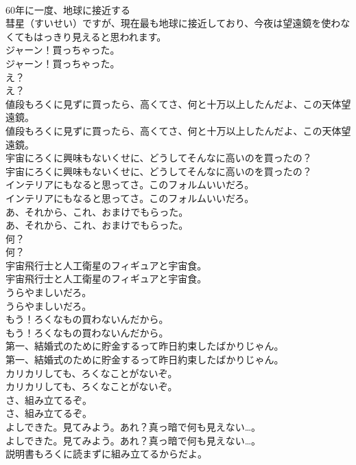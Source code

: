 \documentclass[8pt]{extreport}
\begin{document}
\begin{CJK}{UTF8}{min}
\\	60年に一度、地球に接近する
\\	彗星（すいせい）ですが、現在最も地球に接近しており、今夜は望遠鏡を使わなくてもはっきり見えると思われます。 
\\	ジャーン！買っちゃった。	
\\	ジャーン！買っちゃった。 
\\	え？	
\\	え？ 
\\	値段もろくに見ずに買ったら、高くてさ、何と十万以上したんだよ、この天体望遠鏡。	
\\	値段もろくに見ずに買ったら、高くてさ、何と十万以上したんだよ、この天体望遠鏡。 
\\	宇宙にろくに興味もないくせに、どうしてそんなに高いのを買ったの？	
\\	宇宙にろくに興味もないくせに、どうしてそんなに高いのを買ったの？ 
\\	インテリアにもなると思ってさ。このフォルムいいだろ。	
\\	インテリアにもなると思ってさ。このフォルムいいだろ。 
\\	あ、それから、これ、おまけでもらった。	
\\	あ、それから、これ、おまけでもらった。 
\\	何？	
\\	何？ 
\\	宇宙飛行士と人工衛星のフィギュアと宇宙食。	
\\	宇宙飛行士と人工衛星のフィギュアと宇宙食。 
\\	うらやましいだろ。	
\\	うらやましいだろ。 
\\	もう！ろくなもの買わないんだから。	
\\	もう！ろくなもの買わないんだから。 
\\	第一、結婚式のために貯金するって昨日約束したばかりじゃん。	
\\	第一、結婚式のために貯金するって昨日約束したばかりじゃん。 
\\	カリカリしても、ろくなことがないぞ。	
\\	カリカリしても、ろくなことがないぞ。 
\\	さ、組み立てるぞ。
\\	さ、組み立てるぞ。
\\	よしできた。見てみよう。あれ？真っ暗で何も見えない…。	
\\	よしできた。見てみよう。あれ？真っ暗で何も見えない…。 
\\	説明書もろくに読まずに組み立てるからだよ。	

\end{CJK}
\end{document}
